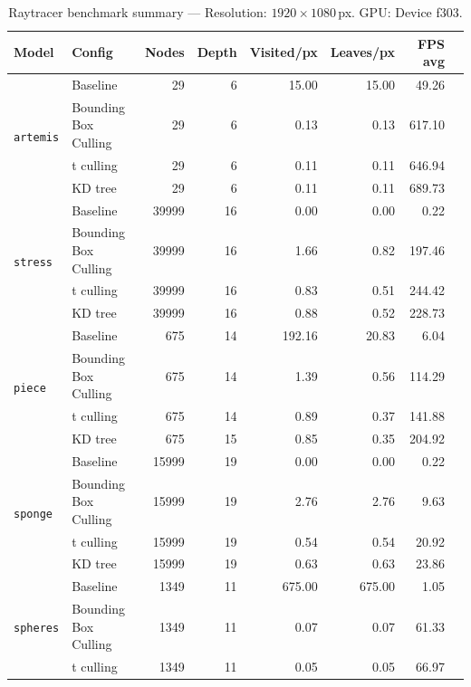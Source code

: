 
\begin{table}[htbp]
  \centering\small
  \setlength{\tabcolsep}{4pt}
  \caption{Raytracer benchmark summary --- Resolution: $1920\times1080$\,px. GPU: Device f303.}
  \label{tab:rt-summary}
  \begin{tabular}{@{}llrrrrrr@{}}
    \toprule
    \textbf{Model} & \textbf{Config} & \textbf{Nodes} & \textbf{Depth} & \textbf{Visited/px} & \textbf{Leaves/px} & \textbf{FPS avg} \\
    \midrule
    \multirow{4}{*}{\texttt{artemis}} & Baseline & 29 & 6 & 15.00 & 15.00 & 49.26 \\
     & Bounding Box Culling & 29 & 6 & 0.13 & 0.13 & 617.10 \\
     & t culling & 29 & 6 & 0.11 & 0.11 & 646.94 \\
     & KD tree & 29 & 6 & 0.11 & 0.11 & 689.73 \\
    \midrule
    \multirow{4}{*}{\texttt{stress}} & Baseline & 39999 & 16 & 0.00 & 0.00 & 0.22 \\
     & Bounding Box Culling & 39999 & 16 & 1.66 & 0.82 & 197.46 \\
     & t culling & 39999 & 16 & 0.83 & 0.51 & 244.42 \\
     & KD tree & 39999 & 16 & 0.88 & 0.52 & 228.73 \\
    \midrule
    \multirow{4}{*}{\texttt{piece}} & Baseline & 675 & 14 & 192.16 & 20.83 & 6.04 \\
     & Bounding Box Culling & 675 & 14 & 1.39 & 0.56 & 114.29 \\
     & t culling & 675 & 14 & 0.89 & 0.37 & 141.88 \\
     & KD tree & 675 & 15 & 0.85 & 0.35 & 204.92 \\
    \midrule
    \multirow{4}{*}{\texttt{sponge}} & Baseline & 15999 & 19 & 0.00 & 0.00 & 0.22 \\
     & Bounding Box Culling & 15999 & 19 & 2.76 & 2.76 & 9.63 \\
     & t culling & 15999 & 19 & 0.54 & 0.54 & 20.92 \\
     & KD tree & 15999 & 19 & 0.63 & 0.63 & 23.86 \\
    \midrule
    \multirow{4}{*}{\texttt{spheres}} & Baseline & 1349 & 11 & 675.00 & 675.00 & 1.05 \\
     & Bounding Box Culling & 1349 & 11 & 0.07 & 0.07 & 61.33 \\
     & t culling & 1349 & 11 & 0.05 & 0.05 & 66.97 \\

\end{tabular}
\end{table}
